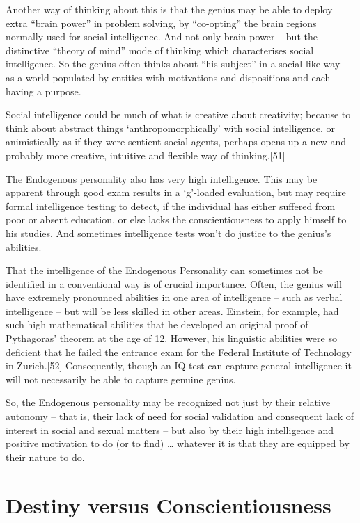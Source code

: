 \documentclass[
]{book}
\begin{document}
Another way of thinking about this is that the genius may be able to deploy extra ``brain power'' in problem solving, by ``co-opting'' the brain regions normally used for social intelligence. And not only brain power -- but the distinctive ``theory of mind'' mode of thinking which characterises social intelligence. So the genius often thinks about ``his subject'' in a social-like way -- as a world populated by entities with motivations and dispositions and each having a purpose.

Social intelligence could be much of what is creative about creativity; because to think about abstract things `anthropomorphically' with social intelligence, or animistically as if they were sentient social agents, perhaps opens-up a new and probably more creative, intuitive and flexible way of thinking.{[}51{]}

The Endogenous personality also has very high intelligence. This may be apparent through good exam results in a `g'-loaded evaluation, but may require formal intelligence testing to detect, if the individual has either suffered from poor or absent education, or else lacks the conscientiousness to apply himself to his studies. And sometimes intelligence tests won't do justice to the genius's abilities.

That the intelligence of the Endogenous Personality can sometimes not be identified in a conventional way is of crucial importance. Often, the genius will have extremely pronounced abilities in one area of intelligence -- such as verbal intelligence -- but will be less skilled in other areas. Einstein, for example, had such high mathematical abilities that he developed an original proof of Pythagoras' theorem at the age of 12. However, his linguistic abilities were so deficient that he failed the entrance exam for the Federal Institute of Technology in Zurich.{[}52{]} Consequently, though an IQ test can capture general intelligence it will not necessarily be able to capture genuine genius.

So, the Endogenous personality may be recognized not just by their relative autonomy -- that is, their lack of need for social validation and consequent lack of interest in social and sexual matters -- but also by their high intelligence and positive motivation to do (or to find) \ldots{} whatever it is that they are equipped by their nature to do.

\hypertarget{destiny-versus-conscientiousness}{%
\chapter{Destiny versus Conscientiousness}\label{destiny-versus-conscientiousness}}
\end{document}
